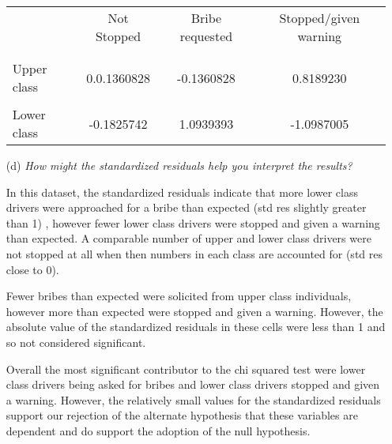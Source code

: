 \documentclass[12pt,letterpaper]{article}
\begin{document}
\begin{enumerate}
		\begin{table}[h]
			\centering
			\begin{tabular}{l | c c c }
				& Not Stopped & Bribe requested & Stopped/given warning \\
				\\[-1.8ex] 
				\hline \\[-1.8ex]
				Upper class   &  0.0.1360828  & -0.1360828  & 0.8189230  \\
				\\
				Lower class & -0.1825742 & 1.0939393   & -1.0987005  \\
				
			\end{tabular}
		\end{table}
		
		\vspace{.5cm}
		\item [(d)] \emph{How might the standardized residuals help you interpret the results?  }
		
		\noindent  In this dataset, the standardized residuals indicate that more lower class drivers were approached for a bribe than expected (std res slightly greater than 1) , however fewer lower class drivers were stopped and given a warning than  expected. A comparable number of upper and lower class drivers were not stopped at all when then numbers in each class are accounted for (std res 
		 close to 0). 
		
		 Fewer bribes than expected were solicited from upper class individuals,  
		 however more than expected were stopped and given a warning. However, the absolute value of the standardized residuals in these cells were less than 1 
		 and so not considered significant. 
		
		 Overall the most significant contributor to the chi squared test were lower 
		 class drivers being asked for bribes and lower class drivers stopped and given 
		 a warning. However, the relatively small values for the standardized residuals
		 support our rejection of the alternate hypothesis that these variables are 
		 dependent and do support the adoption of the null hypothesis. 
	\end{enumerate}
	\newpage
	
\end{document}
